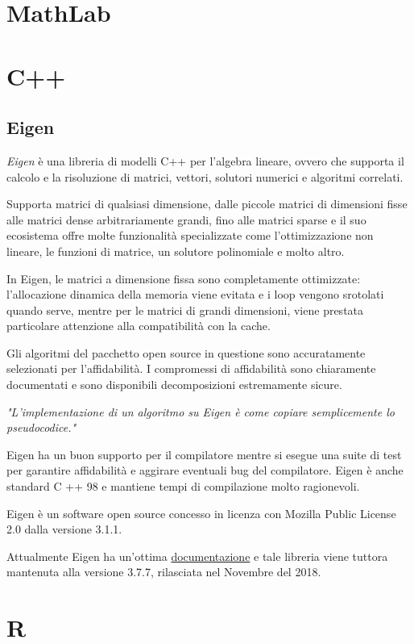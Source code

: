 \section{MathLab} 

\section{C++}
\subsection{Eigen}
\textit{Eigen} è una libreria di modelli C++ per l'algebra lineare, ovvero che supporta il calcolo e la risoluzione di matrici, vettori, solutori numerici e algoritmi correlati.

Supporta matrici di qualsiasi dimensione, dalle piccole matrici di dimensioni fisse alle matrici dense arbitrariamente grandi, fino alle matrici sparse e il suo ecosistema offre molte funzionalità specializzate come l'ottimizzazione non lineare, le funzioni di matrice, un solutore polinomiale e molto altro.

In Eigen, le matrici a dimensione fissa sono completamente ottimizzate: l'allocazione dinamica della memoria viene evitata e i loop vengono srotolati quando serve, mentre per le matrici di grandi dimensioni, viene prestata particolare attenzione alla compatibilità con la cache.

Gli algoritmi del pacchetto open source in questione sono accuratamente selezionati per l'affidabilità. I compromessi di affidabilità sono chiaramente documentati e sono disponibili decomposizioni estremamente sicure.

\textit{"L'implementazione di un algoritmo su Eigen è come copiare semplicemente lo pseudocodice."}

Eigen ha un buon supporto per il compilatore mentre si esegue una suite di test per garantire affidabilità e aggirare eventuali bug del compilatore. Eigen è anche standard C ++ 98 e mantiene tempi di compilazione molto ragionevoli.

Eigen è un software open source concesso in licenza con Mozilla Public License 2.0 dalla versione 3.1.1. 

Attualmente Eigen ha un'ottima \href{http://eigen.tuxfamily.org/dox/}{documentazione} e tale libreria viene tuttora mantenuta alla versione 3.7.7, rilasciata nel Novembre del 2018.

\section{R}
